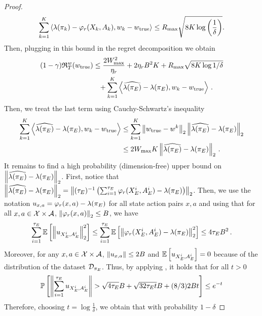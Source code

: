 \begin{proof}
\begin{equation*}
        \sum^K_{k=1} \left\langle{\lambda(\pi_k) - \varphi_r(X_k, A_k)},{w_k - w_{\mathrm{true}}}\right\rangle \leq R_{\max} \sqrt{8  K \log \left({\frac{1}{\delta}}\right)}.
    \end{equation*}
    Then, plugging in this bound in the regret decomposition we obtain
    \begin{align*}
        (1-\gamma) \mathfrak{R}_T^w(w_{\mathrm{true}}) &\leq \frac{2 W_{\max}^2}{\eta_r} + 2 \eta_r B^2 K + R_{\max} \sqrt{8K \log 1 / \delta} \\
        &\phantom{=}+ \sum^K_{k=1} \left\langle{\widehat{\lambda({\pi_E})} - \lambda({\pi_E})},{ w_k-w_{\mathrm{true}}}\right\rangle\,.
    \end{align*}
    Then, we treat the last term using Cauchy-Schwartz's inequality
    \begin{align*}
        \sum^K_{k=1} \left\langle{\widehat{\lambda({\pi_E})} - \lambda({\pi_E})},{ w_k-w_{\mathrm{true}}}\right\rangle &\leq \sum^K_{k=1}\left\|w_{\mathrm{true}}-w^k\right\|_{2}\left\|\widehat{\lambda({\pi_E})} - \lambda({\pi_E})\right\|_2 \\
        &\leq 2 W_{\max} K \left\|\widehat{\lambda({\pi_E})} - \lambda({\pi_E})\right\|_2\,.
    \end{align*}
    It remains to find a high probability (dimension-free) upper bound on $\left\|\widehat{\lambda({\pi_E})} - \lambda({\pi_E})\right\|_{2}$. First, notice that $\left\|\widehat{\lambda({\pi_E})} - \lambda({\pi_E})\right\|_{2} = \left\|(\tau_E)^{-1} \left({\sum^{\tau_E}_{i=1} \varphi_r(X^i_E,A^i_E) - \lambda({\pi_E}) }\right)\right\|_2$. Then, we use the notation $u_{x,a} = \varphi_r(x,a) - \lambda({\pi_E}) $ for all state action pairs $x,a$ and using that for all $x, a \in \mathcal{X} \times \mathcal{A}$, $\left\|\varphi_r(x, a)\right\|_2 \leq B$, we have
    \begin{equation*}
        \sum^{\tau_E}_{i=1} \mathbb{E}\left[{\left\|u_{X^i_E,A^i_E}\right\|_2^2}\right] \leq \sum^{\tau_E}_{i=1} \mathbb{E}\left[{\left\|\varphi_r(X^i_E, A^i_E) - \lambda({\pi_E})\right\|_2^2}\right] \leq 4\tau_E B^2\,.
    \end{equation*}
    Moreover, for any $x, a \in \mathcal{X} \times \mathcal{A}$, $\left\|u_{x,a}\right\| \leq 2 B$ and $\mathbb{E} \left[{u_{X^i_E, A^i_E}}\right] = 0$ because of the distribution of the dataset $\mathcal{D}_{\pi_E} $. Thus, by applying \cite[Proposition 2]{hsu2012tail}, it holds that for all $t > 0$
    \begin{equation*}
        \mathbb{P}\left[{\left\|\sum^{\tau_E}_{i=1} u_{X^i_E, A^i_E}\right\| > \sqrt{4 \tau_E} B + \sqrt{32 \tau_E t} B + (8/3)2Bt}\right] \leq e^{-t}
    \end{equation*}
    Therefore, choosing $t = \log \frac{1}{\delta}$, we obtain that with probability $1 - \delta$

\end{proof}
